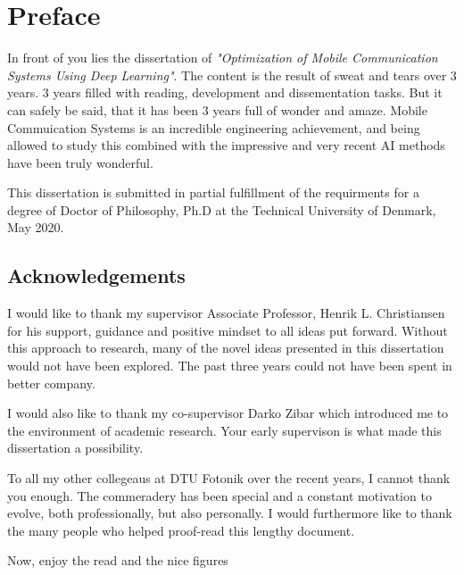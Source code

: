 \chapter*{Preface}
In front of you lies the dissertation of \emph{"Optimization of Mobile Communication Systems Using Deep Learning"}. The content is the result of sweat and tears over 3 years. 3 years filled with reading, development and dissementation tasks. But it can safely be said, that it has been 3 years full of wonder and amaze. Mobile Commuication Systems is an incredible engineering achievement, and being allowed to study this combined with the impressive and very recent AI methods have been truly wonderful. 

This dissertation is submitted in partial fulfillment of the requirments for a degree of Doctor of Philosophy, Ph.D at the Technical University of Denmark, May 2020.


\section*{Acknowledgements}

I would like to thank my supervisor Associate Professor, Henrik L. Christiansen for his support, guidance and positive mindset to all ideas put forward. Without this approach to research, many of the novel ideas presented in this dissertation would not have been explored. The past three years could not have been spent in better company.

I would also like to thank my co-supervisor Darko Zibar which introduced me to the environment of academic research. Your early supervison is what made this dissertation a possibility.

To all my other collegeaus at DTU Fotonik over the recent years, I cannot thank you enough. The commeradery has been special and a constant motivation to evolve, both professionally, but also personally.
I would furthermore like to thank the many people who helped proof-read this lengthy document.

Now, enjoy the read and the nice figures

\vspace{4em}



